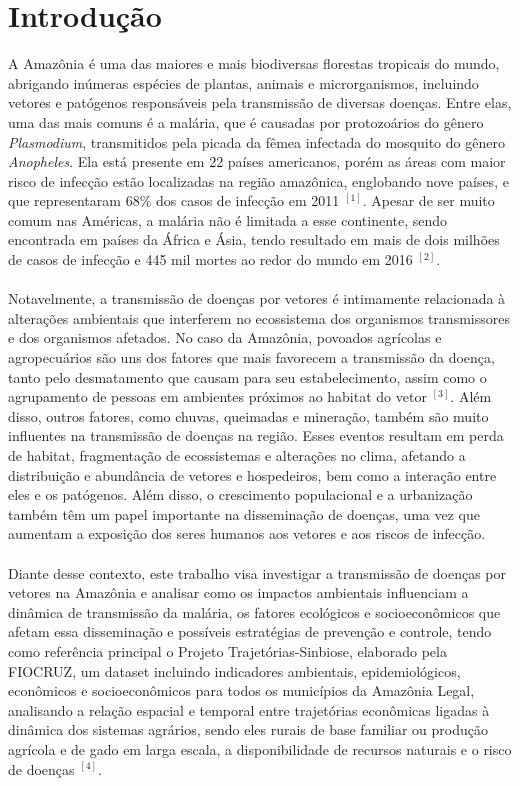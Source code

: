 \documentclass[12pt]{article}
\begin{document}
\newpage
\tableofcontents
\thispagestyle{empty}

\newpage
\section{Introdução}

A Amazônia é uma das maiores e mais biodiversas florestas tropicais do mundo, abrigando inúmeras espécies de plantas, animais e microrganismos, incluindo vetores e patógenos responsáveis pela transmissão de diversas doenças. Entre elas, uma das mais comuns é a malária, que é causadas por protozoários do gênero \textit{Plasmodium}, transmitidos pela picada da fêmea infectada do mosquito do gênero \textit{Anopheles}. Ela está presente em 22 países americanos, porém as áreas com maior risco de infecção estão localizadas na região amazônica, englobando nove países, e que representaram $68\%$ dos casos de infecção em 2011 $^{[1]}$. Apesar de ser muito comum nas Américas, a malária não é limitada a esse continente, sendo encontrada em países da África e Ásia, tendo resultado em mais de dois milhões de casos de infecção e  445 mil mortes ao redor do mundo em 2016 $^{[2]}$.    
\\\\
Notavelmente, a transmissão de doenças por vetores é intimamente relacionada à alterações ambientais que interferem no ecossistema dos organismos transmissores e dos organismos afetados. No caso da Amazônia, povoados agrícolas e agropecuários são uns dos fatores que mais favorecem a transmissão da doença, tanto pelo desmatamento que causam para seu estabelecimento, assim como o agrupamento de pessoas em ambientes próximos ao habitat do vetor $^{[3]}$. Além disso, outros fatores, como chuvas, queimadas e mineração, também são muito influentes na transmissão de doenças na região. Esses eventos resultam em perda de habitat, fragmentação de ecossistemas e alterações no clima, afetando a distribuição e abundância de vetores e hospedeiros, bem como a interação entre eles e os patógenos. Além disso, o crescimento populacional e a urbanização também têm um papel importante na disseminação de doenças, uma vez que aumentam a exposição dos seres humanos aos vetores e aos riscos de infecção.
\\\\
Diante desse contexto, este trabalho visa investigar a transmissão de doenças por vetores na Amazônia e analisar como os impactos ambientais influenciam a dinâmica de transmissão da malária, os fatores ecológicos e socioeconômicos que afetam essa disseminação e possíveis estratégias de prevenção e controle, tendo como referência principal o Projeto Trajetórias-Sinbiose, elaborado pela FIOCRUZ, um dataset incluindo indicadores ambientais, epidemiológicos, econômicos e socioeconômicos para todos os municípios da Amazônia Legal, analisando a relação espacial e temporal entre trajetórias econômicas ligadas à dinâmica dos sistemas agrários, sendo eles rurais de base familiar ou produção agrícola e de gado em larga escala, a disponibilidade de recursos naturais e o risco de doenças $^{[4]}$.
\end{document}
